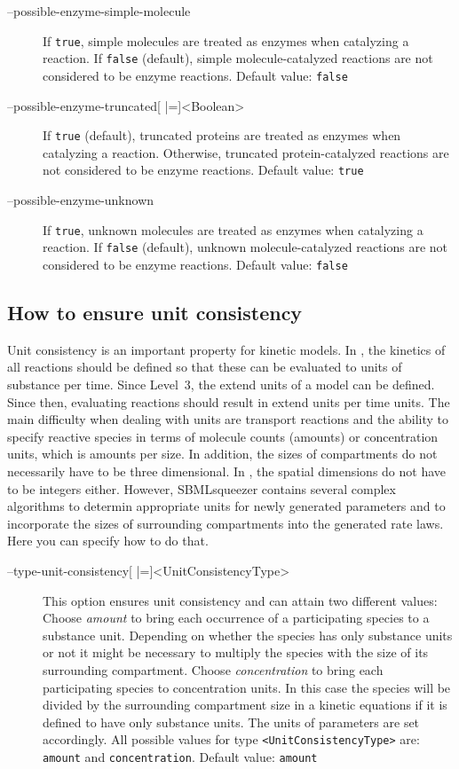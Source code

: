 \begin{description}
\item[--possible-enzyme-simple-molecule]
  If \texttt{true}, simple molecules are treated as enzymes when catalyzing
  a reaction. If \texttt{false} (default), simple molecule-catalyzed reactions
  are not considered to be enzyme reactions.
  Default value: \texttt{false}

\item[--possible-enzyme-truncated{[} |={]}<Boolean>]
  If \texttt{true} (default), truncated proteins are treated as enzymes
  when catalyzing a reaction. Otherwise, truncated protein-catalyzed
  reactions are not considered to be enzyme reactions.
  Default value: \texttt{true}

\item[--possible-enzyme-unknown]
  If \texttt{true}, unknown molecules are treated as enzymes when catalyzing
  a reaction. If \texttt{false} (default), unknown molecule-catalyzed reactions
  are not considered to be enzyme reactions.
  Default value: \texttt{false}
\end{description}

\subsection{How to ensure unit consistency}

Unit consistency is an important property for kinetic models. In \SBML, the
kinetics of all reactions should be defined so that these can be evaluated to
units of substance per time. Since Level~3, the extend units of a model can be
defined. Since then, evaluating reactions should result in extend units per time
units. The main difficulty when dealing with units are transport reactions and
the ability to specify reactive species in terms of molecule counts (amounts) or
concentration units, which is amounts per size. In addition, the sizes of
compartments do not necessarily have to be three dimensional. In \SBML, the
spatial dimensions do not have to be integers either. However, SBMLsqueezer
contains several complex algorithms to determin appropriate units for newly
generated parameters and to incorporate the sizes of surrounding compartments
into the generated rate laws. Here you can specify how to do that.  
\begin{description}
\item[--type-unit-consistency{[} |={]}<UnitConsistencyType>]
  This option ensures unit consistency and can attain two different
  values: Choose \emph{amount} to bring each occurrence of a participating
  species to a substance unit. Depending on whether the species
  has only substance units or not it might be necessary to multiply
  the species with the size of its surrounding compartment. Choose
  \emph{concentration} to bring each participating species to concentration
  units. In this case the species will be divided by the surrounding
  compartment size in a kinetic equations if it is defined to
  have only substance units. The units of parameters are set accordingly.
  All possible values for type \texttt{<UnitConsistencyType>} are:
  \texttt{amount} and \texttt{concentration}.
  Default value: \texttt{amount}
\end{description}

